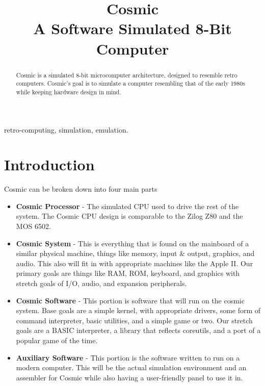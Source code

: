 \documentclass[conference]{IEEEtran}
\begin{document}
\title{
 Cosmic\\A Software Simulated 8-Bit Computer}

\author{
\and
{}

}

\maketitle

\begin{abstract}
Cosmic is a simulated 8-bit microcomputer architecture, designed to resemble retro computers. Cosmic's goal is to simulate a computer resembling that of the early 1980s while keeping hardware design in mind. 
\end{abstract}

\begin{IEEEkeywords}
retro-computing, simulation, emulation.
\end{IEEEkeywords}

\section{Introduction}
Cosmic can be broken down into four main parts
\begin{itemize}
    \item \textbf{Cosmic Processor} - The simulated CPU used to drive the rest of the system. The Cosmic CPU design is comparable to the Zilog Z80 and the MOS 6502. 
    \item \textbf{Cosmic System} - This is everything that is found on the mainboard of a similar physical machine, things like memory, input \& output, graphics, and audio. This also will fit in with appropriate machines like the Apple II. Our primary goals are things like RAM, ROM, keyboard, and graphics with stretch goals of I/O, audio, and expansion peripherals. 
    \item \textbf{Cosmic Software}  - This portion is software that will run on the cosmic system. Base goals are a simple kernel, with appropriate drivers, some form of command interpreter, basic utilities, and a simple game or two. Our stretch goals are a BASIC interpreter, a library that reflects coreutils, and a port of a popular game of the time. 
    \item \textbf{Auxiliary Software} - This portion is the software written to run on a modern computer. This will be the actual simulation environment and an assembler for Cosmic while also having a user-friendly panel to use it in.
\end{itemize}
\end{document}
